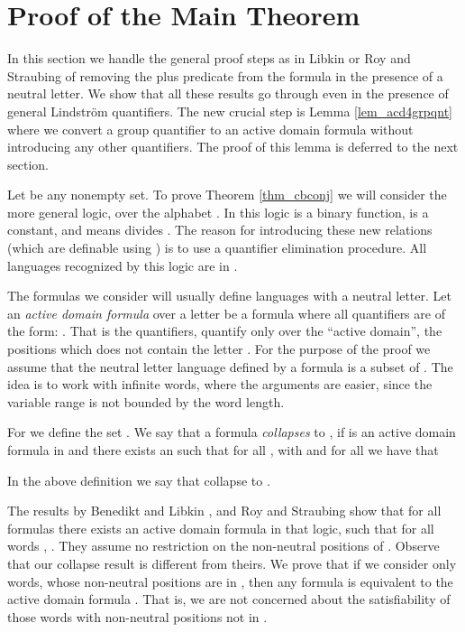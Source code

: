 \documentclass[envcountsame]{llncs}
\begin{document}
\bigskip
\section{Proof of the Main Theorem}\label{sec_cranebeach}
In this section we handle the general proof steps as in Libkin or Roy and Straubing of removing the plus predicate from the formula in the presence of a neutral letter. We show that all these results go through even in the presence of general Lindstr\"om quantifiers. The new crucial step is Lemma \ref{lem_acd4grpqnt} where we convert a group quantifier to an active domain formula without introducing any other quantifiers. The proof of this lemma is deferred to the next section.


Let  be any nonempty set. To prove Theorem \ref{thm_cbconj} we will consider the more general logic,  over 
the alphabet . In this logic  is a binary function,  is a constant, and  means  divides . 
The reason for introducing these new relations (which are definable using ) is to use a quantifier elimination procedure.
All languages recognized by this logic are in . 

The formulas we consider will usually define languages with a neutral letter. 
Let an \emph{active domain formula} over a letter  be a formula where all quantifiers are of the form:
.
That is the quantifiers, quantify only over the ``active domain'', the positions which does not contain the letter .
For the purpose of the proof we assume that the neutral letter language defined by a formula  is a subset of . 
The idea is to work with infinite words, where the arguments are easier, since the variable range is not bounded by the word length.

For  we define the set . We say that a formula  \emph{collapses} to , if  is an active domain formula in  and there exists an 
 such that for all ,  with 
 and for all  we have that 
 
In the above definition we say that  collapse  to .

The results by Benedikt and Libkin \cite{libkin_relIntrStruc}, and Roy and Straubing \cite{roy_defGenFO} show that for all formulas  
there exists an active domain formula  in that logic, such that for all words , . 
They assume no restriction on the non-neutral positions of . Observe that our collapse result is different from theirs. We prove that if we consider only words, 
whose non-neutral positions are in , then any formula  is equivalent to the active domain
formula . 
That is, we are not concerned about the satisfiability of those words with non-neutral positions not in .
\end{document}
